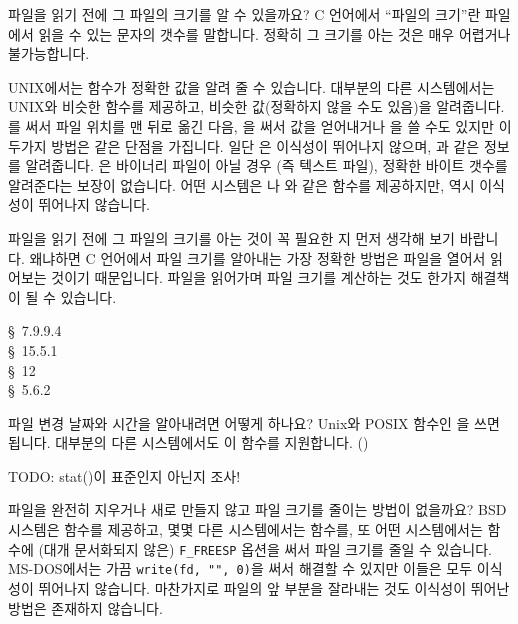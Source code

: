 \begin{faq}
	파일을 읽기 전에 그 파일의 크기를 알 수 있을까요?
\A
	C 언어에서 ``파일의 크기''란 파일에서 읽을 수 있는 문자의 갯수를
	말합니다.  정확히 그 크기를 아는 것은 매우 어렵거나 불가능합니다.

	UNIX에서는  함수가 정확한 값을 알려 줄 수 있습니다.
	대부분의 다른 시스템에서는 UNIX와 비슷한  함수를 제공하고,
	비슷한 값(정확하지 않을 수도 있음)을 알려줍니다.
	를 써서 파일 위치를 맨 뒤로 옮긴 다음, 을
	써서 값을 얻어내거나 을 쓸 수도 있지만
	이 두가지 방법은 같은 단점을 가집니다.  일단 은
	이식성이 뛰어나지 않으며, 과 같은 정보를 알려줍니다.
	은 바이너리 파일이 아닐 경우 (즉 텍스트 파일),
	정확한 바이트 갯수를 알려준다는 보장이 없습니다.
	어떤 시스템은 나 와 같은
	함수를 제공하지만, 역시 이식성이 뛰어나지 않습니다.

	파일을 읽기 전에 그 파일의 크기를 아는 것이 꼭 필요한 지
	먼저 생각해 보기 바랍니다.  왜냐하면 C 언어에서 파일 크기를
	알아내는 가장 정확한 방법은 파일을 열어서 읽어보는 것이기
	때문입니다.  파일을 읽어가며 파일 크기를 계산하는 것도
	한가지 해결책이 될 수 있습니다.


\R
	\cite{c89} \S\ 7.9.9.4 \\
	\cite{hs} \S\ 15.5.1 \\
	\cite{pcs} \S\ 12  \\
	\cite{posix} \S\ 5.6.2
\end{faq}

\begin{faq}
	파일 변경 날짜와 시간을 알아내려면 어떻게 하나요?
\A
	Unix와 POSIX 함수인 을 쓰면 됩니다.
	대부분의 다른 시스템에서도 이 함수를 지원합니다.
	()

\T
	TODO: stat()이 표준인지 아닌지 조사!
	
\end{faq}

\begin{faq}
	파일을 완전히 지우거나 새로 만들지 않고 파일 크기를 줄이는
	방법이 없을까요?
\A
	BSD 시스템은  함수를 제공하고, 몇몇 다른 시스템에서는
	 함수를, 또 어떤 시스템에서는  함수에
	(대개 문서화되지 않은) \verb+F_FREESP+ 옵션을 써서 파일 크기를
	줄일 수 있습니다.  MS-DOS에서는 가끔 \verb+write(fd, "", 0)+을 써서
	해결할 수 있지만 이들은 모두 이식성이 뛰어나지 않습니다.
	마찬가지로 파일의 앞 부분을 잘라내는 것도 이식성이 뛰어난 방법은
	존재하지 않습니다.
\end{faq}

